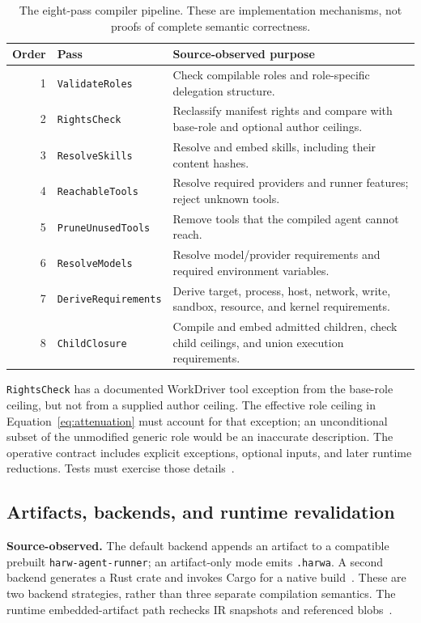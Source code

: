 \begin{table}[htbp]
\centering
\small
\renewcommand{\arraystretch}{1.16}
\begin{tabularx}{\linewidth}{@{}r l >{\raggedright\arraybackslash}X@{}}
\toprule
\textbf{Order} & \textbf{Pass} & \textbf{Source-observed purpose} \\
\midrule
1 & \texttt{ValidateRoles} & Check compilable roles and role-specific delegation structure. \\
2 & \texttt{RightsCheck} & Reclassify manifest rights and compare with base-role and optional author ceilings. \\
3 & \texttt{ResolveSkills} & Resolve and embed skills, including their content hashes. \\
4 & \texttt{ReachableTools} & Resolve required providers and runner features; reject unknown tools. \\
5 & \texttt{PruneUnusedTools} & Remove tools that the compiled agent cannot reach. \\
6 & \texttt{ResolveModels} & Resolve model/provider requirements and required environment variables. \\
7 & \texttt{DeriveRequirements} & Derive target, process, host, network, write, sandbox, resource, and kernel requirements. \\
8 & \texttt{ChildClosure} & Compile and embed admitted children, check child ceilings, and union execution requirements. \\
\bottomrule
\end{tabularx}
\caption{The eight-pass compiler pipeline. These are implementation mechanisms, not proofs of complete semantic correctness.}
\label{tab:compiler-passes}
\end{table}

\texttt{RightsCheck} has a documented WorkDriver tool exception from the base-role ceiling, but not from a supplied author ceiling. The effective role ceiling in Equation~\ref{eq:attenuation} must account for that exception; an unconditional subset of the unmodified generic role would be an inaccurate description. The operative contract includes explicit exceptions, optional inputs, and later runtime reductions. Tests must exercise those details~\cite{ref17}.

\subsection{Artifacts, backends, and runtime revalidation}

\textbf{Source-observed.} The default backend appends an artifact to a compatible prebuilt \texttt{harw-agent-runner}; an artifact-only mode emits \texttt{.harwa}. A second backend generates a Rust crate and invokes Cargo for a native build~\cite{ref18}. These are two backend strategies, rather than three separate compilation semantics. The runtime embedded-artifact path rechecks IR snapshots and referenced blobs~\cite{ref19}.

